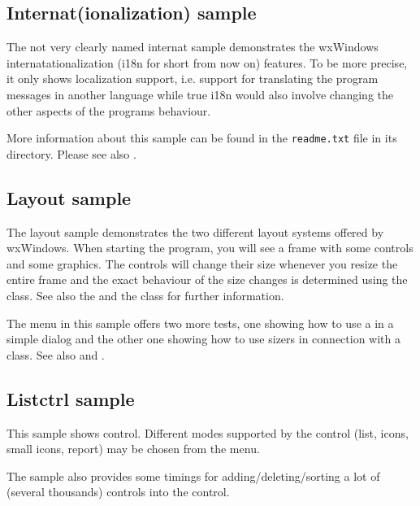 \subsection{Internat(ionalization) sample}\label{sampleinternat}

The not very clearly named internat sample demonstrates the wxWindows
internatationalization (i18n for short from now on) features. To be more
precise, it only shows localization support, i.e. support for translating the
program messages in another language while true i18n would also involve
changing the other aspects of the programs behaviour.

More information about this sample can be found in the {\tt readme.txt} file in
its directory. Please see also \label{internationalization}.

\subsection{Layout sample}\label{samplelayout}

The layout sample demonstrates the two different layout systems offered
by wxWindows. When starting the program, you will see a frame with some
controls and some graphics. The controls will change their size whenever
you resize the entire frame and the exact behaviour of the size changes
is determined using the  
class. See also the  and the 
class for further information.

The menu in this sample offers two more tests, one showing how to use
a  in a simple dialog and the other one
showing how to use sizers in connection with a  
class. See also  and 
.

\subsection{Listctrl sample}\label{samplelistctrl}

This sample shows  control. Different modes
supported by the control (list, icons, small icons, report) may be chosen from
the menu.

The sample also provides some timings for adding/deleting/sorting a lot of
(several thousands) controls into the control.

